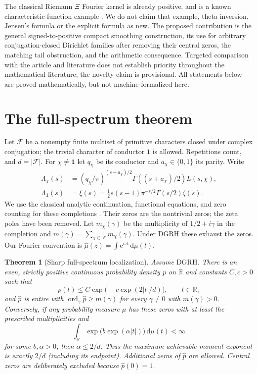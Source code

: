 \documentclass[11pt]{article}
\newtheorem{theorem}{Theorem}[section]
\theoremstyle{remark}\newtheorem{remark}[theorem]{Remark}
\newcommand{\R}{\mathbb R}\newcommand{\C}{\mathbb C}\newcommand{\dd}{\,\mathrm d}
\newcommand{\ee}{\mathrm e}\newcommand{\abs}[1]{\lvert#1\rvert}
\newcommand{\GRH}{\mathrm{DGRH}}
\newcommand{\spec}{\mathcal F}
\DeclareMathOperator{\ord}{ord}
\begin{document}
The classical Riemann $\Xi$ Fourier kernel is already positive, and is a known characteristic-function example \cite{titchmarsh,polson}. We do not claim that example, theta inversion, Jensen's formula or the explicit formula as new. The proposed contribution is the general signed-to-positive compact smoothing construction, its use for arbitrary conjugation-closed Dirichlet families after removing their central zeros, the matching tail obstruction, and the arithmetic consequence. Targeted comparison with the article and literature does not establish priority throughout the mathematical literature; the novelty claim is provisional. All statements below are proved mathematically, but not machine-formalized here.

\section{The full-spectrum theorem}
Let $\spec$ be a nonempty finite multiset of primitive characters closed under complex conjugation; the trivial character of conductor $1$ is allowed. Repetitions count, and $d=|\spec|$. For $\chi\ne\mathbf1$ let $q_\chi$ be its conductor and $a_\chi\in\{0,1\}$ its parity. Write
\begin{align*}
\Lambda_\chi(s)&=(q_\chi/\pi)^{(s+a_\chi)/2}\Gamma((s+a_\chi)/2)L(s,\chi),\\
\Lambda_{\mathbf1}(s)&=\xi(s)=\tfrac12 s(s-1)\pi^{-s/2}\Gamma(s/2)\zeta(s).
\end{align*}
We use the classical analytic continuation, functional equations, and zero counting for these completions \cite{davenport,titchmarsh}. Their zeros are the nontrivial zeros; the zeta poles have been removed. Let $m_\chi(\gamma)$ be the multiplicity of $1/2+i\gamma$ in the completion and $m(\gamma)=\sum_{\chi\in\spec}m_\chi(\gamma)$. Under $\GRH$ these exhaust the zeros. Our Fourier convention is $\widehat\mu(z)=\int\ee^{izt}\dd\mu(t)$.

\begin{theorem}[Sharp full-spectrum localization]\label{thm:main}
Assume $\GRH$. There is an even, strictly positive continuous probability density $p$ on $\R$ and constants $C,c>0$ such that
\begin{equation}\label{eq:tail}
 p(t)\le C\exp\big(-c\exp(2|t|/d)\big),\qquad t\in\R,
\end{equation}
and $\widehat p$ is entire with $\ord_\gamma\widehat p\ge m(\gamma)$ for every $\gamma\ne0$ with $m(\gamma)>0$. Conversely, if any probability measure $\mu$ has these zeros with at least the prescribed multiplicities and
\begin{equation}\label{eq:moment}
 \int_\R \exp\big(b\exp(\alpha|t|)\big)\dd\mu(t)<\infty
\end{equation}
for some $b,\alpha>0$, then $\alpha\le 2/d$. Thus the maximum achievable moment exponent is exactly $2/d$ (including its endpoint). Additional zeros of $\widehat p$ are allowed. Central zeros are deliberately excluded because $\widehat p(0)=1$.
\end{theorem}
\end{document}
